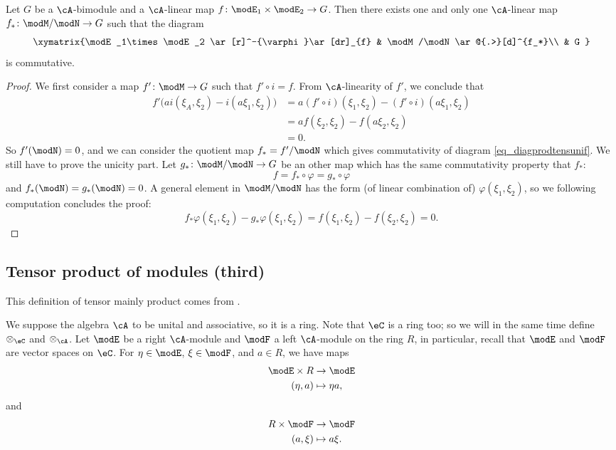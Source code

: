 \begin{proposition}
	Let $G$ be a $\cA$-bimodule and a $\cA$-linear map $f\colon \modE_1\times\modE_2\to G$. Then there exists one and only one $\cA$-linear map $f_*\colon \modM/\modN\to G$ such that the diagram
	\begin{equation}  \label{eq_diagprodtensunif}
		\xymatrix{%
		\modE_1\times\modE_2 \ar[r]^-{\varphi}\ar[dr]_{f}		&	\modM/\modN\ar@{.>}[d]^{f_*}\\
		&	G
		}
	\end{equation}
	is commutative.
\end{proposition}

\begin{proof}
	We first consider a map $f'\colon \modM\to G$ such that $f'\circ i=f$. From $\cA$-linearity of $f'$, we conclude that
	\[
		\begin{split}
			f'\big( ai(\xi_A,\xi_2)-i(a\xi_1,\xi_2) \big)&=a(f'\circ i)(\xi_1,\xi_2)-(f'\circ i)(a\xi_1,\xi_2)\\
			&=af(\xi_2,\xi_2)-f(a\xi_2,\xi_2)\\
			&=0.
		\end{split}
	\]
	So $f'(\modN)=0$, and we can consider the quotient map $f_*=f'/\modN$ which gives commutativity of diagram \eqref{eq_diagprodtensunif}. We still have to prove the unicity part. Let $g_*\colon \modM/\modN\to G$ be an other map which has the same commutativity property that $f_*$:
	\[
		f=f_*\circ \varphi=g_*\circ\varphi
	\]
	and $f_*(\modN)=g_*(\modN)=0$. A general element in $\modM/\modN$ has the form (of linear combination of) $\varphi(\xi_1,\xi_2)$, so we following computation concludes the proof:
	\[
		f_*\varphi(\xi_1,\xi_2)-g_*\varphi(\xi_1,\xi_2)=f(\xi_1,\xi_2)-f(\xi_2,\xi_2)=0.
	\]
\end{proof}

\subsection{Tensor product of modules (third)}

This definition of tensor mainly product comes from \cite{Jacobson_alg}.

We suppose the algebra $\cA$ to be unital and associative, so it is a ring. Note that $\eC$ is a ring too; so we will in the same time define $\otimes_{\eC}$ and $\otimes_{\cA}$. Let $\modE$ be a right $\cA$-module and $\modF$ a left $\cA$-module on the ring $R$, in particular, recall that $\modE$ and $\modF$ are vector spaces on $\eC$. For $\eta\in\modE$, $\xi\in\modF$, and $a\in R$, we have maps
\begin{equation}
	\begin{aligned}
		\modE\times R & \to \modE       \\
		(\eta,a)      & \mapsto \eta a,
	\end{aligned}
\end{equation}
and
\begin{equation}
	\begin{aligned}
		R\times\modF & \to \modF     \\
		(a,\xi)      & \mapsto a\xi.
	\end{aligned}
\end{equation}

